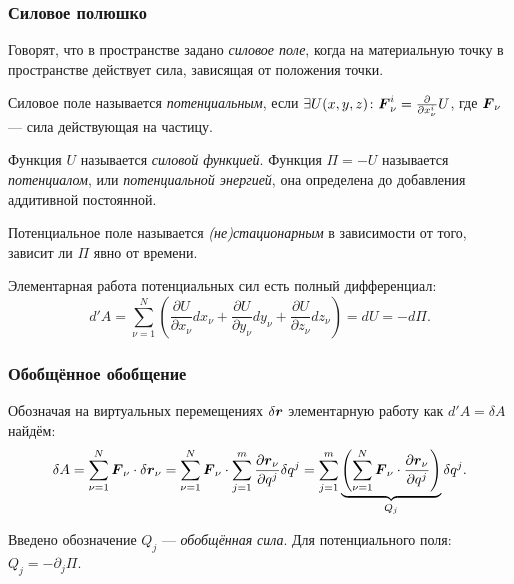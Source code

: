 \subsubsection*{Силовое полюшко}
\begin{to_def}
	Говорят, что в пространстве задано \textit{силовое поле}, когда на материальную точку в пространстве действует сила, зависящая от положения точки.
\end{to_def}
\begin{to_def}
	Силовое поле называется \textit{потенциальным}, если $\exists U(x,y,z)\colon \mbox{\boldmath $F$}_\nu^i = \frac{\partial}{\partial x_\nu^i} U$, где $\mbox{\boldmath $F$}_\nu$ --- сила действующая на частицу.
\end{to_def}
\begin{to_def}
	Функция $U$ называется \textit{силовой функцией}. Функция $\Pi = -U$ называется \textit{потенциалом}, или \textit{потенциальной энергией}, она определена до добавления аддитивной постоянной.
\end{to_def}
\begin{to_def}
	Потенциальное поле называется \textit{(не)стационарным} в зависимости от того, зависит ли $\Pi$ явно от времени.
\end{to_def}

\noindent
Элементарная работа потенциальных сил есть полный дифференциал:
\begin{equation*}
	d' A = \sum_{\nu=1}^N \left(\frac{\partial U}{\partial x_\nu} d x_\nu + \frac{\partial U}{\partial y_\nu} d y_\nu + \frac{\partial U}{\partial z_\nu} d z_\nu\right) = d U = -d \Pi.
\end{equation*}

\subsubsection*{Обобщённое обобщение}
Обозначая на виртуальных перемещениях $\delta \mbox{\boldmath $r$}$ элементарную работу как $d'A = \delta A$ найдём:
\begin{equation*}
	\delta A = \sum_{\nu=1}^N \mbox{\boldmath $F$}_\nu \cdot \delta \mbox{\boldmath $r$}_\nu
	=
	\sum_{\nu=1}^N \mbox{\boldmath $F$}_\nu \cdot \sum_{j=1}^m \frac{\partial \mbox{\boldmath $r$}_\nu}{\partial q^j}\delta q^j
	=
	\sum_{j=1}^m
	\underbrace{\left(\sum_{\nu=1}^N \mbox{\boldmath $F$}_\nu \cdot \frac{\partial \mbox{\boldmath $r$}_\nu }{\partial q^j}\right)}_{Q_j}
	\delta q^j.
\end{equation*}

\begin{to_def}
	Введено обозначение $Q_j$ --- \textit{обобщённая} \textit{сила}. Для потенциального поля: $Q_j = - \partial_j \Pi $.
\end{to_def}
